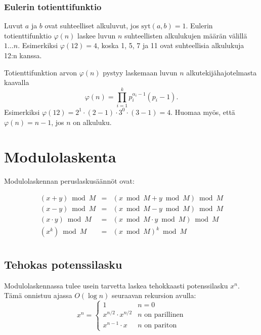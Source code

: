 \subsubsection{Eulerin totienttifunktio}


Luvut $a$ ja $b$ ovat suhteelliset alkuluvut,
jos $\textrm{syt}(a,b)=1$.
Eulerin totienttifunktio $\varphi(n)$
laskee luvun $n$ suhteellisten alkulukujen
määrän välillä $1 \ldots n$.
Esimerkiksi $\varphi(12)=4$,
koska 1, 5, 7 ja 11 ovat suhteellisia
alkulukuja 12:n kanssa.

Totienttifunktion arvon $\varphi(n)$ pystyy laskemaan
luvun $n$ alkutekijähajotelmasta kaavalla
\[ \varphi(n) = \prod_{i=1}^k p_i^{\alpha_i-1}(p_i-1). \]
Esimerkiksi $\varphi(12)=2^1 \cdot (2-1) \cdot 3^0 \cdot (3-1)=4$.
Huomaa myös, että $\varphi(n)=n-1$,
jos $n$ on alkuluku.

\section{Modulolaskenta}

Modulolaskennan peruslaskusäännöt ovat:

\[
\begin{array}{lcl}
(x+y) \bmod M & = & (x \bmod M + y \bmod M) \bmod M \\
(x-y) \bmod M & = & (x \bmod M - y \bmod M) \bmod M \\
(x \cdot y) \bmod M & = & (x \bmod M \cdot y \bmod M) \bmod M \\
(x^k) \bmod M & = & (x \bmod M)^k \bmod M \\
\end{array}
\]

\subsection{Tehokas potenssilasku}

Modulolaskennassa tulee usein tarvetta laskea
tehokkaasti potenssilasku $x^n$.
Tämä onnistuu ajassa $O(\log n)$
seuraavan rekursion avulla:
\begin{equation*}
    x^n = \begin{cases}
               1        & n = 0\\
               x^{n/2} \cdot x^{n/2} & \text{$n$ on parillinen}\\
               x^{n-1} \cdot x & \text{$n$ on pariton}
           \end{cases}
\end{equation*}

